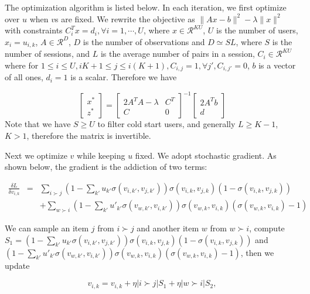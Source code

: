 \documentclass[11pt]{report}
\newcommand{\Real}{\mathcal{R}}
\begin{document}
The optimization algorithm is listed below. In each iteration, we first optimize over $u$ when $v$s are fixed. We rewrite the objective as $\|Ax-b\|^2-\lambda \|x\|^2$ with constraints $C_i^Tx=d_i, \forall i=1,\cdots,U$, where $x\in \Real^{KU}$, $U$ is the number of users, $x_i=u_{i,k}$, $A\in \Real^{D}$, $D$ is the number of observations and $D\simeq SL$, where $S$ is the number of sessions, and $L$ is the average number of pairs in a session, $C_i\in \Real^{KU}$ where for $1\leq i \leq U, iK+1\leq j \leq i(K+1), C_{i,j}=1, \forall j', C_{i,j'}=0$, $b$ is a vector of all ones, $d_i=1$ is a scalar. Therefore we have

\begin{equation}
\begin{bmatrix}
x^* \\
z^*
\end{bmatrix} = \begin{bmatrix}
2A^TA-\lambda & C^T \\
C & 0
\end{bmatrix}^{-1}
\begin{bmatrix}
2A^Tb \\
d
\end{bmatrix}
\end{equation}
Note that we have $S\geq U$ to filter cold start users, and generally $L\geq K-1$, $K>1$, therefore the matrix is invertible. 

Next we optimize $v$ while keeping $u$ fixed. We adopt stochastic gradient.  As shown below, the gradient is the addiction of two terms:

\begin{eqnarray*}
\frac{\delta L}{\delta v_{i,k}}&=&\sum_{i\succ j} (1-\sum_{k'} u_{k'}\sigma(v_{i,k'},v_{j,k'}))\sigma(v_{i,k},v_{j,k})(1-\sigma(v_{i,k},v_{j,k}))\\
&&+ \sum_{w\succ i} (1-\sum_{k'} u'_{k'}\sigma(v_{w,k'},v_{i,k'}))\sigma(v_{w,k},v_{i,k})(\sigma(v_{w,k},v_{i,k})-1)
\end{eqnarray*}

We can sample an item $j$ from $i\succ j$ and another item $w$ from $w\succ i$,  compute $S_1= (1-\sum_{k'} u_{k'}\sigma(v_{i,k'},v_{j,k'}))\sigma(v_{i,k},v_{j,k})(1-\sigma(v_{i,k},v_{j,k}))$ and $(1-\sum_{k'} u'_{k'}\sigma(v_{w,k'},v_{i,k'}))\sigma(v_{w,k},v_{i,k})(\sigma(v_{w,k},v_{i,k})-1)$, then we update 

\begin{equation}
v_{i,k}=v_{i,k}+\eta |i\succ j| S_1 +\eta |w\succ i| S_2,
\end{equation}
\end{document}
